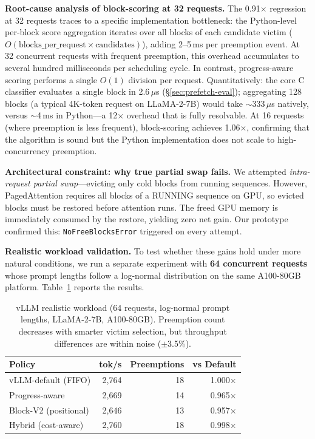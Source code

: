 \documentclass[conference]{IEEEtran}
\begin{document}
\textbf{Root-cause analysis of block-scoring at 32 requests.} The 0.91$\times$ regression at 32 requests traces to a specific implementation bottleneck: the Python-level per-block score aggregation iterates over all blocks of each candidate victim ($O(\text{blocks\_per\_request} \times \text{candidates})$), adding 2--5\,ms per preemption event. At 32 concurrent requests with frequent preemption, this overhead accumulates to several hundred milliseconds per scheduling cycle. In contrast, progress-aware scoring performs a single $O(1)$ division per request. Quantitatively: the core C classifier evaluates a single block in 2.6\,$\mu$s (\S\ref{sec:prefetch-eval}); aggregating 128 blocks (a typical 4K-token request on LLaMA-2-7B) would take ${\sim}$333\,$\mu$s natively, versus ${\sim}$4\,ms in Python---a 12$\times$ overhead that is fully resolvable. At 16 requests (where preemption is less frequent), block-scoring achieves 1.06$\times$, confirming that the algorithm is sound but the Python implementation does not scale to high-concurrency preemption.

\textbf{Architectural constraint: why true partial swap fails.} We attempted \emph{intra-request partial swap}---evicting only cold blocks from running sequences. However, PagedAttention requires all blocks of a RUNNING sequence on GPU, so evicted blocks must be restored before attention runs. The freed GPU memory is immediately consumed by the restore, yielding zero net gain. Our prototype confirmed this: \texttt{NoFreeBlocksError} triggered on every attempt.

\textbf{Realistic workload validation.} To test whether these gains hold under more natural conditions, we run a separate experiment with \textbf{64 concurrent requests} whose prompt lengths follow a log-normal distribution on the same A100-80GB platform. Table~\ref{tab:vllm-realistic} reports the results.

\begin{table}[t]
\centering
\caption{vLLM realistic workload (64 requests, log-normal prompt lengths, LLaMA-2-7B, A100-80GB). Preemption count decreases with smarter victim selection, but throughput differences are within noise ($\pm$3.5\%).}
\label{tab:vllm-realistic}
\small
\begin{tabular}{@{}lrrr@{}}
\toprule
Policy & tok/s & Preemptions & vs Default \\
\midrule
vLLM-default (FIFO)    & 2{,}764 & 18 & 1.000$\times$ \\
Progress-aware          & 2{,}669 & 14 & 0.965$\times$ \\
Block-V2 (positional)   & 2{,}646 & 13 & 0.957$\times$ \\
Hybrid (cost-aware)     & 2{,}760 & 18 & 0.998$\times$ \\
\bottomrule
\end{tabular}
\end{table}
\end{document}
